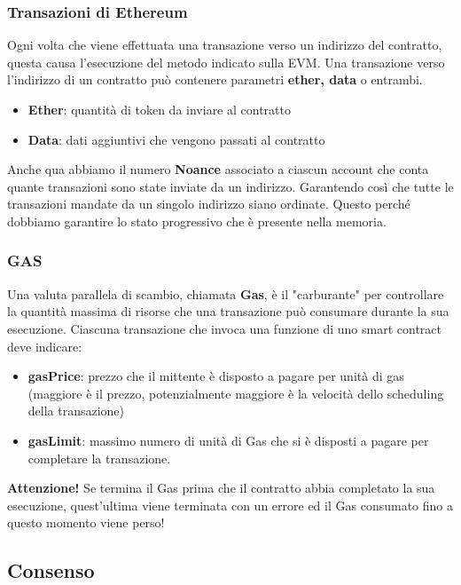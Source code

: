 \documentclass[a4paper]{article}
\begin{document}
\subsubsection{Transazioni di Ethereum}

Ogni volta che viene effettuata una transazione verso un indirizzo del contratto, questa causa l'esecuzione del metodo indicato sulla EVM.
Una transazione verso l'indirizzo di un contratto può contenere parametri \textbf{ether, data} o entrambi.
\begin{itemize}
    \item \textbf{Ether}: quantità di token da inviare al contratto
    \item \textbf{Data}: dati aggiuntivi che vengono passati al contratto
\end{itemize}
Anche qua abbiamo il numero \textbf{Noance} associato a ciascun account che conta quante transazioni sono state inviate da un indirizzo. Garantendo così che
tutte le transazioni mandate da un singolo indirizzo siano ordinate.
Questo perché dobbiamo garantire lo stato progressivo che è presente nella memoria.

\subsubsection{GAS}

Una valuta parallela di scambio, chiamata \textbf{Gas}, è il "carburante" per controllare la quantità massima di risorse che una transazione può consumare durante la sua esecuzione.
Ciascuna transazione che invoca una funzione di uno smart contract deve indicare:
\begin{itemize}
    \item \textbf{gasPrice}: prezzo che il mittente è disposto a pagare per unità di gas (maggiore è il prezzo, potenzialmente maggiore è la velocità dello scheduling della transazione)
    \item \textbf{gasLimit}: massimo numero di unità di Gas che si è disposti a pagare per completare la transazione.
\end{itemize}
\noindent
\textbf{Attenzione!} Se termina il Gas prima che il contratto abbia completato la sua esecuzione, quest'ultima viene terminata con un errore ed il Gas consumato fino a questo momento viene perso!

\subsection{Consenso}
\end{document}
